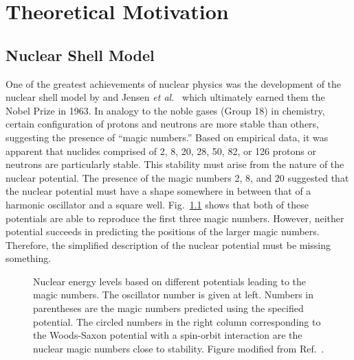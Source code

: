 \chapter{Theoretical Motivation}

\section{Nuclear Shell Model}
\label{sec:shell}
One of the greatest achievements of nuclear physics was the development of the nuclear shell model by \citet{Goeppert-Mayer_1950} and Jensen \textit{et al.}~\cite{Haxel_1949} which ultimately earned them the Nobel Prize in 1963.  In analogy to the noble gases (Group 18) in chemistry, certain configuration of protons and neutrons are more stable than others, suggesting the presence of ``magic numbers.''  Based on empirical data, it was apparent that nuclides comprised of 2, 8, 20, 28, 50, 82, or 126 protons or neutrons are particularly stable.  This stability must arise from the nature of the nuclear potential.  The presence of the magic numbers 2, 8, and 20 suggested that the nuclear potential must have a shape somewhere in between that of a harmonic oscillator and a square well.  Fig.~\ref{magic_numbers} shows that both of these potentials are able to reproduce the first three magic numbers.  However, neither potential succeeds in predicting the positions of the larger magic numbers.  Therefore, the simplified description of the nuclear potential must be missing something.

\begin{figure}%
\centering
{}
\caption[Nuclear energy levels based on different potentials leading to the magic numbers]{Nuclear energy levels based on different potentials leading to the magic numbers.  The oscillator number is given at left.  Numbers in parentheses are the magic numbers predicted using the specified potential.  The circled numbers in the right column corresponding to the Woods-Saxon potential with a spin-orbit interaction are the nuclear magic numbers close to stability.  Figure modified from Ref.~\cite{Kay_2007}.}%
\label{magic_numbers}%
\end{figure}

